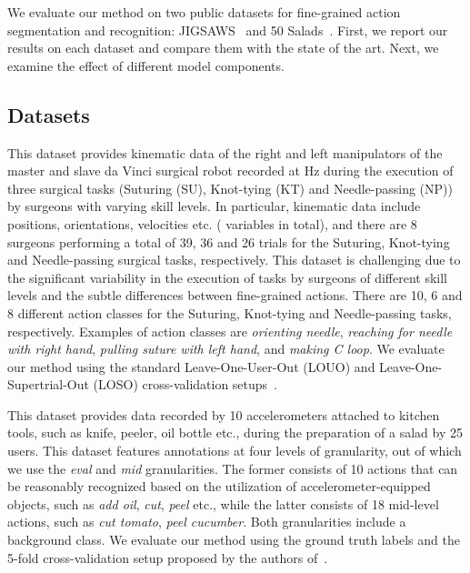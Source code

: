 \documentclass[10pt,twocolumn,letterpaper]{article}
\begin{document}
We evaluate our method on two public datasets for fine-grained action segmentation and recognition: JIGSAWS~\cite{Gao2014} and 50 Salads~\cite{Stein:UbiComp13}. First, we report our results on each
dataset and compare them with the state of the art. Next, we
examine the effect of different model components.

\subsection{Datasets}
 This dataset provides kinematic data of the right and left manipulators of the master and slave da Vinci surgical robot recorded at  Hz during the execution of three surgical tasks (Suturing (SU), Knot-tying (KT) and Needle-passing (NP)) by surgeons with varying skill levels. In particular, kinematic data include positions, orientations, velocities etc. ( variables in total), and there are 8 surgeons performing a total of 39, 36 and 26 trials for the Suturing, Knot-tying and Needle-passing surgical tasks, respectively. This dataset is challenging due to the significant variability in the execution of tasks by surgeons of different skill levels and the subtle differences between fine-grained actions. There are 10, 6 and 8 different action classes for the Suturing, Knot-tying and Needle-passing tasks, respectively. Examples of action classes are \emph{orienting needle}, \emph{reaching for needle with right hand}, \emph{pulling suture with left hand}, and \emph{making C loop}. We evaluate our method using the standard Leave-One-User-Out (LOUO) and Leave-One-Supertrial-Out (LOSO) cross-validation setups~\cite{Ahmidi:TBME17}.

 This dataset provides data recorded by 10 accelerometers attached to kitchen tools, such as knife, peeler, oil bottle etc., during the preparation of a salad by 25 users. This dataset features annotations at four levels of granularity, out of which we use the \emph{eval} and \emph{mid} granularities. The former consists of 10 actions that can be reasonably recognized based on the utilization of accelerometer-equipped objects, such as \emph{add oil}, \emph{cut}, \emph{peel} etc., while the latter consists of 18 mid-level actions, such as \emph{cut tomato}, \emph{peel cucumber}. Both granularities include a background class. We evaluate our method using the ground truth labels and the 5-fold cross-validation setup proposed by the authors of~\cite{Lea:ECCV16-WBNIMR,Lea:CVPR17}. 
\end{document}
